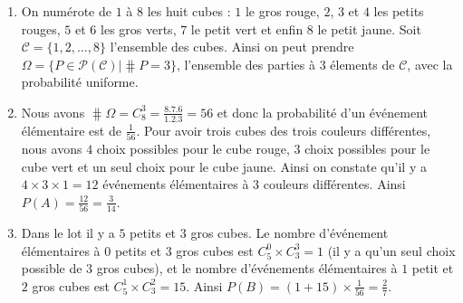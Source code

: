 \documentclass[a4paper,12pt,reqno]{amsart}
\begin{document}
\begin{solution}
  \begin{enumerate}
    \item On numérote de $1$ à $8$ les huit cubes : $1$ le gros rouge, $2$, $3$ et $4$ les petits rouges, $5$ et $6$ les gros verts, $7$ le petit vert et enfin $8$ le petit jaune. Soit $\mathcal{C}=\{1,2,\ldots,8\}$ l'ensemble des cubes. Ainsi on peut prendre $\Omega = \{P \in \mathcal{P}(\mathcal{C}) | \hash P = 3\}$, l'ensemble des parties à 3 élements de $\mathcal{C}$, avec la probabilité uniforme.
    \item Nous avons $\hash \Omega = C^{3}_{8}=\frac{8.7.6}{1.2.3} = 56$ et donc la probabilité d'un événement élémentaire est de $\frac{1}{56}$. Pour avoir trois cubes des trois couleurs différentes, nous avons $4$ choix possibles pour le cube rouge, $3$ choix possibles pour le cube vert et un seul choix pour le cube jaune. Ainsi on constate qu'il y a $4 \times 3 \times 1 = 12$ événements élémentaires à $3$ couleurs différentes. Ainsi $P(A)=\frac{12}{56}=\frac{3}{14}$.
    \item Dans le lot il y a $5$ petits et $3$ gros cubes. Le nombre d'événement élémentaires à $0$ petits et $3$ gros cubes est $C^{0}_{5} \times C^{3}_{3}=1$ (il y a qu'un seul choix possible de 3 gros cubes), et le nombre d'événements élémentaires à $1$ petit et $2$ gros cubes est $C^{1}_{5} \times C^{2}_{3} = 15$. Ainsi $P(B) = (1+15) \times \frac{1}{56} = \frac{2}{7}$.
  \end{enumerate}

\end{solution}
\end{document}
